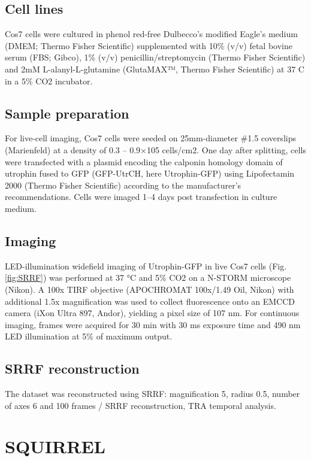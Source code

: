 \subsection{Cell lines}

Cos7 cells were cultured in phenol red-free Dulbecco’s modified Eagle’s medium (DMEM; Thermo Fisher Scientific) supplemented with 10\% (v/v) fetal bovine serum (FBS; Gibco), 1\% (v/v) penicillin/streptomycin (Thermo Fisher Scientific) and 2mM L-alanyl-L-glutamine (GlutaMAX™, Thermo Fisher Scientific) at 37 \degree C in a 5\% CO2 incubator.

\subsection{Sample preparation}

For live-cell imaging, Cos7 cells were seeded on 25mm-diameter \#1.5 coverslips (Marienfeld) at a density of 0.3 – 0.9×105 cells/cm2. One day after splitting, cells were transfected with a plasmid encoding the calponin homology domain of utrophin fused to GFP (GFP-UtrCH, here Utrophin-GFP) \cite{burkel2007versatile} using Lipofectamin 2000 (Thermo Fisher Scientific) according to the manufacturer’s recommendations. Cells were imaged 1–4 days post transfection in culture medium.

\subsection{Imaging}

LED-illumination widefield imaging of Utrophin-GFP in live Cos7 cells (Fig. \ref{fig:SRRF}) was performed at 37 °C and 5\% CO2 on a N-STORM microscope (Nikon). A 100x TIRF objective (APOCHROMAT 100x/1.49 Oil, Nikon) with additional 1.5x magnification was used to collect fluorescence onto an EMCCD camera (iXon Ultra 897, Andor), yielding a pixel size of 107 nm. For continuous imaging, frames were acquired for 30 min with 30 ms exposure time and 490 nm LED illumination at 5\% of maximum output. 

\subsection{SRRF reconstruction}

The dataset was reconstructed using SRRF: magnification 5, radius 0.5, number of axes 6 and 100 frames / SRRF reconstruction, TRA temporal analysis. 


\section{SQUIRREL}

